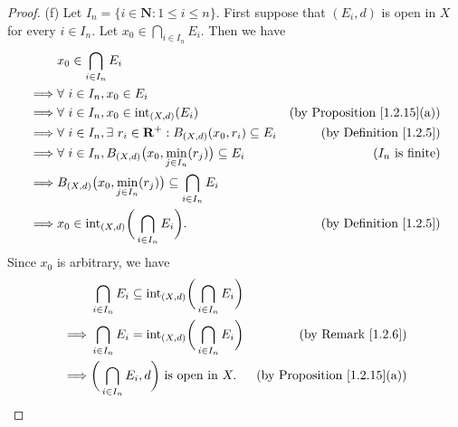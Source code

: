 \begin{proof}{(f)}
    Let \(I_n = \{i \in \mathbf{N} : 1 \leq i \leq n\}\).
    First suppose that \((E_i, d)\) is open in \(X\) for every \(i \in I_n\).
    Let \(x_0 \in \bigcap_{i \in I_n} E_i\).
    Then we have
    \begin{align*}
                 & x_0 \in \bigcap_{i \in I_n} E_i                                                                                                  \\
        \implies & \forall\ i \in I_n, x_0 \in E_i                                                                                                  \\
        \implies & \forall\ i \in I_n, x_0 \in \text{int}_{(X, d)}(E_i)                                   & \text{(by Proposition \ref{1.2.15}(a))} \\
        \implies & \forall\ i \in I_n, \exists\ r_i \in \mathbf{R}^+ : B_{(X, d)}(x_0, r_i) \subseteq E_i & \text{(by Definition \ref{1.2.5})}      \\
        \implies & \forall\ i \in I_n, B_{(X, d)}\big(x_0, \min_{j \in I_n}(r_j)\big) \subseteq E_i       & \text{(\(I_n\) is finite)}              \\
        \implies & B_{(X, d)}\big(x_0, \min_{j \in I_n}(r_j)\big) \subseteq \bigcap_{i \in I_n} E_i                                                 \\
        \implies & x_0 \in \text{int}_{(X, d)}\bigg(\bigcap_{i \in I_n} E_i\bigg).                        & \text{(by Definition \ref{1.2.5})}
    \end{align*}
    Since \(x_0\) is arbitrary, we have
    \begin{align*}
                 & \bigcap_{i \in I_n} E_i \subseteq \text{int}_{(X, d)}\bigg(\bigcap_{i \in I_n} E_i\bigg)                                           \\
        \implies & \bigcap_{i \in I_n} E_i = \text{int}_{(X, d)}\bigg(\bigcap_{i \in I_n} E_i\bigg)         & \text{(by Remark \ref{1.2.6})}          \\
        \implies & \bigg(\bigcap_{i \in I_n} E_i, d\bigg) \text{ is open in } X.                            & \text{(by Proposition \ref{1.2.15}(a))}
    \end{align*}


\end{proof}
